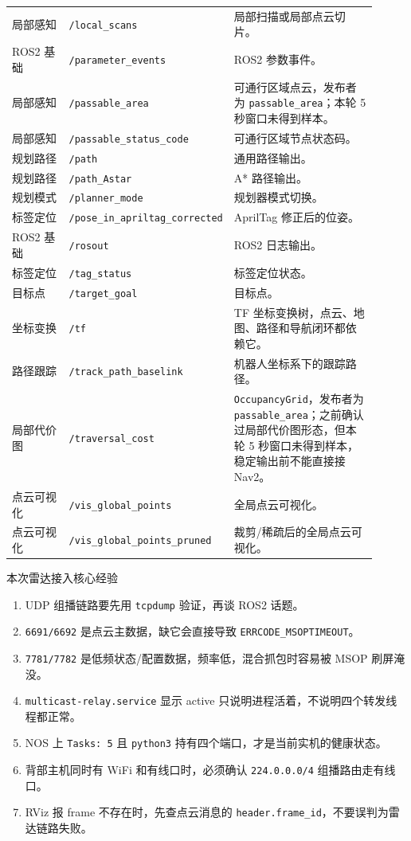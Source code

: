 \documentclass[UTF8,11pt,a4paper]{ctexart}
\begin{document}
{\begin{longtable}{p{0.17\linewidth}p{0.31\linewidth}p{0.43\linewidth}}
局部感知 & \texttt{/local\_scans} & 局部扫描或局部点云切片。\\
ROS2 基础 & \texttt{/parameter\_events} & ROS2 参数事件。\\
局部感知 & \texttt{/passable\_area} & 可通行区域点云，发布者为 \texttt{passable\_area}；本轮 5 秒窗口未得到样本。\\
局部感知 & \texttt{/passable\_status\_code} & 可通行区域节点状态码。\\
规划路径 & \texttt{/path} & 通用路径输出。\\
规划路径 & \texttt{/path\_Astar} & A* 路径输出。\\
规划模式 & \texttt{/planner\_mode} & 规划器模式切换。\\
标签定位 & \texttt{/pose\_in\_apriltag\_corrected} & AprilTag 修正后的位姿。\\
ROS2 基础 & \texttt{/rosout} & ROS2 日志输出。\\
标签定位 & \texttt{/tag\_status} & 标签定位状态。\\
目标点 & \texttt{/target\_goal} & 目标点。\\
坐标变换 & \texttt{/tf} & TF 坐标变换树，点云、地图、路径和导航闭环都依赖它。\\
路径跟踪 & \texttt{/track\_path\_baselink} & 机器人坐标系下的跟踪路径。\\
局部代价图 & \texttt{/traversal\_cost} & \texttt{OccupancyGrid}，发布者为 \texttt{passable\_area}；之前确认过局部代价图形态，但本轮 5 秒窗口未得到样本，稳定输出前不能直接接 Nav2。\\
点云可视化 & \texttt{/vis\_global\_points} & 全局点云可视化。\\
点云可视化 & \texttt{/vis\_global\_points\_pruned} & 裁剪/稀疏后的全局点云可视化。\\
\bottomrule
\end{longtable}
}

\begin{redbox}{本次雷达接入核心经验}
\begin{enumerate}
  \item UDP 组播链路要先用 \texttt{tcpdump} 验证，再谈 ROS2 话题。
  \item \texttt{6691/6692} 是点云主数据，缺它会直接导致 \texttt{ERRCODE\_MSOPTIMEOUT}。
  \item \texttt{7781/7782} 是低频状态/配置数据，频率低，混合抓包时容易被 MSOP 刷屏淹没。
  \item \texttt{multicast-relay.service} 显示 active 只说明进程活着，不说明四个转发线程都正常。
  \item NOS 上 \texttt{Tasks: 5} 且 \texttt{python3} 持有四个端口，才是当前实机的健康状态。
  \item 背部主机同时有 WiFi 和有线口时，必须确认 \texttt{224.0.0.0/4} 组播路由走有线口。
  \item RViz 报 frame 不存在时，先查点云消息的 \texttt{header.frame\_id}，不要误判为雷达链路失败。
\end{enumerate}
\end{redbox}
\end{document}
